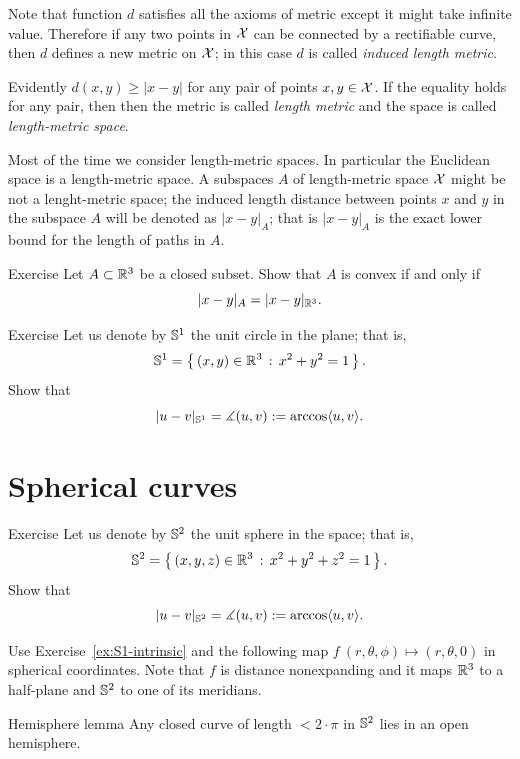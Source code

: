 Note that function $d$ satisfies all the axioms of metric except it might take infinite value.
Therefore if any two points in $\mathcal{X}$ can be connected by a rectifiable curve, then $d$ defines a new metric on $\mathcal{X}$; in this case $d$ is called \emph{induced length metric}.

Evidently $d(x,y)\ge |x-y|$ for any pair of points $x,y\in \mathcal{X}$.
If the equality holds for any pair, then then the metric is called \emph{length metric} and the space is called \emph{length-metric space}.

Most of the time we consider length-metric spaces.
In particular the Euclidean space is a length-metric space.
A subspaces $A$ of length-metric space $\mathcal{X}$ might be not a lenght-metric space;
the induced length distance between points $x$ and $y$ in the subspace $A$ will be denoted as $|x-y|_A$;
that is $|x-y|_A$ is the exact lower bound for the length of paths in $A$.

\begin{thm}{Exercise}\label{ex:intrinsic-convex}
Let $A\subset \mathbb{R}^3$ be a closed subset.
Show that $A$ is convex if and only if
\[|x-y|_A=|x-y|_{\mathbb{R}^3}.\]
\end{thm}

\begin{thm}{Exercise}\label{ex:S1-intrinsic}
Let us denote by $\mathbb{S}^1$ the unit circle in the plane; that is,
\[\mathbb{S}^1=\left\{\,{(x,y)\in\mathbb{R}^3}\,:\,{x^2+y^2=1}\,\right\}.\]
Show that
\[|u-v|_{\mathbb{S}^1}=\measuredangle(u,v):=\arccos\langle u,v\rangle.\]
\end{thm}

\section*{Spherical curves}

\begin{thm}{Exercise}\label{ex:S2-intrinsic}
Let us denote by $\mathbb{S}^2$ the unit sphere in the space; that is,
\[\mathbb{S}^2=\left\{\,{(x,y,z)\in\mathbb{R}^3}\,:\,{x^2+y^2+z^2=1}\,\right\}.\]
Show that
\[|u-v|_{\mathbb{S}^2}=\measuredangle(u,v):=\arccos\langle u,v\rangle.\]

\end{thm}

 Use Exercise~\ref{ex:S1-intrinsic} and the following map $f\:(r,\theta,\phi)\mapsto (r,\theta,0)$ in spherical coordinates. Note that $f$ is distance nonexpanding and it maps $\mathbb{R}^3$ to a half-plane and $\mathbb{S}^2$ to one of its meridians.

\begin{thm}{Hemisphere lemma}
\label{lem:hemisphere}
Any closed curve of length $<2\cdot \pi$ in $\mathbb{S}^2$ lies in an open hemisphere. 
\end{thm}

